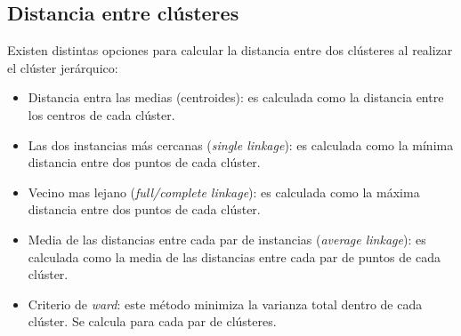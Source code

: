 \subsection{Distancia entre clústeres}
Existen distintas opciones para calcular la distancia entre dos clústeres al realizar el clúster jerárquico:
\begin{itemize}
	\item Distancia entra las medias (centroides): es calculada como la distancia entre los centros de cada clúster.
	\item Las dos instancias más cercanas (\emph{single linkage}): es calculada como la mínima distancia entre dos puntos de cada clúster.
	\item Vecino mas lejano (\emph{full/complete linkage}): es calculada como la máxima distancia entre dos puntos de cada clúster.
	\item Media de las distancias entre cada par de instancias (\emph{average linkage}): es calculada como la media de las distancias entre cada par de puntos de cada clúster.
	\item Criterio de \emph{ward}: este método minimiza la varianza total dentro de cada clúster. Se calcula para cada par de clústeres.
\end{itemize}
